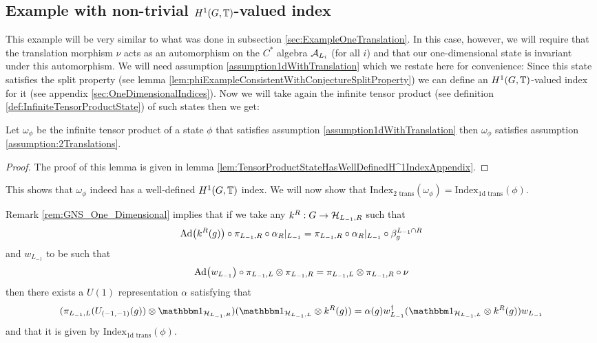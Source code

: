 \documentclass[11pt,a4paper,twoside]{article}
\numberwithin{equation}{section}
\begin{document}
	\subsection{Example with non-trivial $H^1(G,\TT)$-valued index}\label{sec:ExampleTwoTranslations}
	This example will be very similar to what was done in subsection \ref{sec:ExampleOneTranslation}. In this case, however, we will require that the translation morphism $\nu$ acts as an automorphism on the $C^*$ algebra $\AA_{L_i}$ (for all $i$) and that our one-dimensional state is invariant under this automorphism. We will need assumption \ref{assumption1dWithTranslation} which we restate here for convenience:
	\assumptionOneDimensionalTwo*
	Since this state satisfies the split property (see lemma \ref{lem:phiExampleConsistentWithConjectureSplitProperty}) we can define an $H^1(G,\TT)$-valued index for it (see appendix \ref{sec:OneDimensionalIndices}). Now we will take again the infinite tensor product (see definition \ref{def:InfiniteTensorProductState}) of such states then we get:
	\begin{lemma}
		Let $\omega_\phi$ be the infinite tensor product of a state $\phi$ that satisfies assumption \ref{assumption1dWithTranslation} then $\omega_\phi$ satisfies assumption \ref{assumption:2Translations}.
	\end{lemma}
	\begin{proof}
		The proof of this lemma is given in lemma \ref{lem:TensorProductStateHasWellDefinedH^1IndexAppendix}.
	\end{proof}
	This shows that $\omega_\phi$ indeed has a well-defined $H^1(G,\TT)$ index. We will now show that $\textrm{Index}_{\text{2 trans}}(\omega_\phi)=\textrm{Index}_{\text{1d trans}}(\phi)$.
	\begin{remark}\label{rem:GNS_One_DimensionalTwoTranslations}
		Remark \ref{rem:GNS_One_Dimensional} implies that if we take any $k^R:G\rightarrow \HH_{L_{-1},R}$ such that
		\begin{equation}
			\Ad{k^R(g)}\circ\pi_{L_{-1},R}\circ\alpha_R|_{L_{-1}}=\pi_{L_{-1},R}\circ\alpha_R|_{L_{-1}}\circ\beta_{g}^{L_{-1}\cap R}
		\end{equation}
		and $w_{L_{-1}}$ to be such that
		\begin{equation}
			\Ad{w_{L_{-1}}}\circ\pi_{L_{-1},L}\otimes \pi_{L_{-1},R}=\pi_{L_{-1},L}\otimes \pi_{L_{-1},R}\circ\nu
		\end{equation}
		then there exists a $U(1)$ representation $\alpha$ satisfying that
		\begin{equation}
			(\pi_{L_{-1},L}(U_{(-1,-1)}(g))\otimes \id_{\HH_{L_{-1},R}}) (\id_{\HH_{L_{-1},L}}\otimes k^R(g))=\alpha(g) w_{L_{-1}}^\dagger(\id_{\HH_{L_{-1},L}}\otimes k^R(g))w_{L_{-1}}
		\end{equation}
		and that it is given by $\textrm{Index}_{\text{1d trans}}(\phi)$.
	\end{remark}
\end{document}
